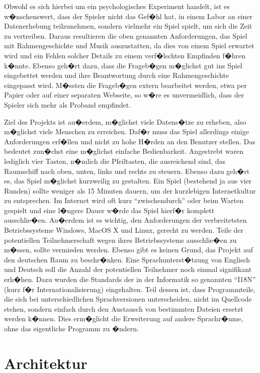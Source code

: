 \documentclass[a4paper,12pt]{scrartcl}
\begin{document}
Obwohl es sich hierbei um ein psychologisches Experiment handelt, ist es w�nschenswert,
dass der Spieler nicht das Gef�hl hat, in einem Labor an einer Datenerhebung
teilzunehmen, sondern vielmehr ein Spiel spielt, um sich die Zeit zu vertreiben.
Daraus resultieren die oben genannten Anforderungen, das Spiel mit
Rahmengeschichte und Musik auszustatten, da dies von einem Spiel erwartet wird und
ein Fehlen solcher Details zu einem verf�lschten Empfinden f�hren k�nnte. Ebenso
geh�rt dazu, dass die Frageb�gen m�glichst gut ins Spiel eingebettet werden und ihre
Beantwortung durch eine Rahmengeschichte eingepasst wird. M�ssten die Frageb�gen
extern bearbeitet werden, etwa per Papier oder auf einer separaten Webseite, so w�re es
unvermeidlich, dass der Spieler sich mehr als Proband empfindet.

Ziel des Projekts ist au�erdem, m�glichst viele Datens�tze zu erheben, also m�glichst viele
Menschen zu erreichen. Daf�r muss das Spiel allerdings einige Anforderungen erf�llen
und nicht zu hohe H�rden an den Benutzer stellen. Das bedeutet zun�chst eine m�glichst
einfache Bedienbarkeit. Angestrebt waren lediglich vier Tasten, n�mlich die Pfeiltasten,
die ausreichend sind, das Raumschiff nach oben, unten, links und rechts zu steuern. Ebenso
dazu geh�rt es, das Spiel m�glichst kurzweilig zu gestalten. Ein Spiel (bestehend ja aus
vier Runden) sollte weniger als 15 Minuten dauern, um der kurzlebigen Internetkultur zu
entsprechen. Im Internet wird oft kurz "`zwischendurch"' oder beim Warten gespielt und eine
l�ngere Dauer w�rde das Spiel hierf�r komplett ausschlie�en. Au�erdem ist es wichtig, den
Anforderungen der verbreitetsten Betriebssysteme Windows, MacOS X und Linux, gerecht zu werden.
Teile der potentiellen Teilnehmerschaft wegen ihres
Betriebssystems ausschlie�en zu m�ssen, sollte vermieden werden. Ebenso gibt es keinen
Grund, das Projekt auf den deutschen Raum zu beschr�nken. Eine Sprachunterst�tzung
von Englisch und Deutsch soll die Anzahl der potentiellen Teilnehmer noch einmal
signifikant erh�hen. Dazu wurden die Standards der in der Informatik so genannten "`I18N"'
(kurz f�r Internationalisierung) eingehalten. Teil dessen ist, dass Programmteile, die sich
bei unterschiedlichen Sprachversionen unterscheiden, nicht im Quellcode stehen, sondern
einfach durch den Austausch von bestimmten Dateien ersetzt werden k�nnen. Dies
erm�glicht die Erweiterung auf andere Sprachr�ume, ohne das eigentliche Programm zu
�ndern.

\section{Architektur}
\end{document}
